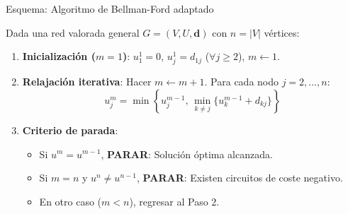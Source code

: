 \documentclass[
  ignorenonframetext,
]{beamer}
\providecommand{\tightlist}{%
  \setlength{\itemsep}{0pt}\setlength{\parskip}{0pt}}
\begin{document}
\begin{frame}{Esquema: Algoritmo de Bellman-Ford adaptado}
\label{esquema-algoritmo-de-bellman-ford-adaptado}
\begin{tcolorbox}[enhanced jigsaw, colframe=quarto-callout-note-color-frame, toptitle=1mm, colback=white, colbacktitle=quarto-callout-note-color!10!white, titlerule=0mm, breakable, coltitle=black, opacityback=0, bottomrule=.15mm, title=\textcolor{quarto-callout-note-color}{\faInfo}\hspace{0.5em}{Algoritmo adaptado para detección de circuitos negativos}, rightrule=.15mm, arc=.35mm, leftrule=.75mm, left=2mm, toprule=.15mm, bottomtitle=1mm, opacitybacktitle=0.6]

Dada una red valorada general \(G = (V, U, \mathbf{d})\) con \(n = |V|\)
vértices:

\begin{enumerate}
\tightlist
\item
  \textbf{Inicialización (\(m=1\))}: \(u_1^1 = 0\), \(u_j^1 = d_{1j}\)
  (\(\forall j \ge 2\)), \(m \leftarrow 1\).
\item
  \textbf{Relajación iterativa}: Hacer \(m \leftarrow m + 1\). Para cada
  nodo \(j = 2, \dots, n\):
  \[u_j^m = \min \left\{ u_j^{m-1}, \, \min_{k \neq j} \{ u_k^{m-1} + d_{kj} \} \right\}\]
\item
  \textbf{Criterio de parada}:

  \begin{itemize}
  \tightlist
  \item
    Si \(u^m = u^{m-1}\), \textbf{PARAR}: Solución óptima alcanzada.
  \item
    Si \(m = n\) y \(u^n \neq u^{n-1}\), \textbf{PARAR}: Existen
    circuitos de coste negativo.
  \item
    En otro caso (\(m < n\)), regresar al Paso 2.
  \end{itemize}
\end{enumerate}

\end{tcolorbox}
\end{frame}
\end{document}
